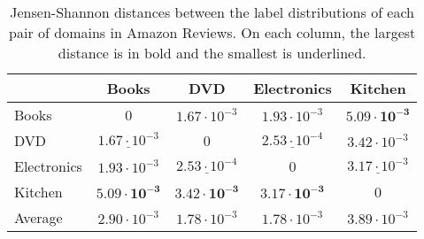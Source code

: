 \begin{table}
	\centering
	\small
	\begin{tabular}{l|cccc}
		& Books                & DVD                  & Electronics          & Kitchen              \\ \hline
		Books       & 0                    & $1.67 \cdot 10^{-3}$ & $1.93 \cdot 10^{-3}$ & $\boldsymbol{5.09 \cdot 10^{-3}}$ \\
		DVD         & $\underline{1.67 \cdot 10^{-3}}$ & 0                    & $\underline{2.53 \cdot 10^{-4}}$ & $3.42 \cdot 10^{-3}$ \\
		Electronics & $1.93 \cdot 10^{-3}$ & $\underline{2.53 \cdot 10^{-4}}$ & 0                    & $\underline{3.17 \cdot 10^{-3}}$ \\
		Kitchen     & $\boldsymbol{5.09 \cdot 10^{-3}}$ & $\boldsymbol{3.42 \cdot 10^{-3}}$ & $\boldsymbol{3.17 \cdot 10^{-3}}$ & 0 \\ \hline
		Average & $2.90 \cdot 10^{-3}$ & $1.78 \cdot 10^{-3}$ & $1.78 \cdot 10^{-3}$ & $3.89 \cdot 10^{-3}$
	\end{tabular}
	\caption{Jensen-Shannon distances between the label distributions of each pair of domains in Amazon Reviews. On each column, the largest distance is in bold and the smallest is underlined.}
	\label{tab:amazon_js}
\end{table}

